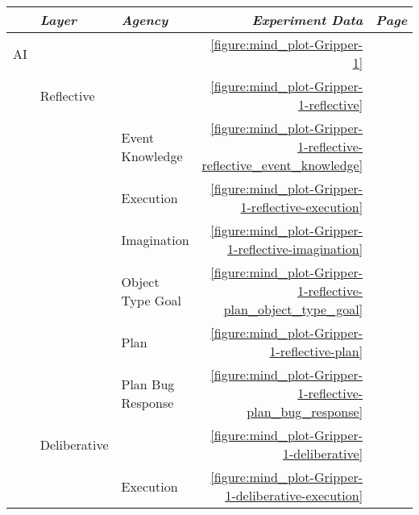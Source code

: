 \begin{table}
  \centering
  \begin{tabular}{lllrr}
    ~         & \emph{Layer}      & \emph{Agency}      & \emph{Experiment Data}                                                      & \emph{Page} \\
    \hline AI &                   &                    & \autoref{figure:mind_plot-Gripper-1}                                        & \pageref{figure:mind_plot-Gripper-1} \\
    ~         & Reflective        &                    & \autoref{figure:mind_plot-Gripper-1-reflective}                             & \pageref{figure:mind_plot-Gripper-1-reflective} \\
    ~         &                   & Event Knowledge    & \autoref{figure:mind_plot-Gripper-1-reflective-reflective_event_knowledge}  & \pageref{figure:mind_plot-Gripper-1-reflective-reflective_event_knowledge} \\
    ~         &                   & Execution          & \autoref{figure:mind_plot-Gripper-1-reflective-execution}                   & \pageref{figure:mind_plot-Gripper-1-reflective-execution} \\
    ~         &                   & Imagination        & \autoref{figure:mind_plot-Gripper-1-reflective-imagination}                 & \pageref{figure:mind_plot-Gripper-1-reflective-imagination} \\
    ~         &                   & Object Type Goal   & \autoref{figure:mind_plot-Gripper-1-reflective-plan_object_type_goal}       & \pageref{figure:mind_plot-Gripper-1-reflective-plan_object_type_goal} \\
    ~         &                   & Plan               & \autoref{figure:mind_plot-Gripper-1-reflective-plan}                        & \pageref{figure:mind_plot-Gripper-1-reflective-plan} \\
    ~         &                   & Plan Bug Response  & \autoref{figure:mind_plot-Gripper-1-reflective-plan_bug_response}           & \pageref{figure:mind_plot-Gripper-1-reflective-plan_bug_response} \\
    ~         & Deliberative      &                    & \autoref{figure:mind_plot-Gripper-1-deliberative}                           & \pageref{figure:mind_plot-Gripper-1-deliberative} \\
    ~         &                   & Execution          & \autoref{figure:mind_plot-Gripper-1-deliberative-execution}                 & \pageref{figure:mind_plot-Gripper-1-deliberative-execution} \\

\end{tabular}
\end{table}

